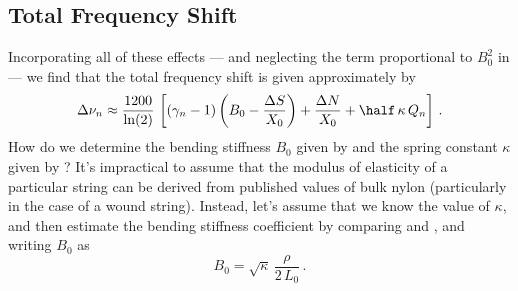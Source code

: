 \subsection{Total Frequency Shift}

Incorporating all of these effects --- and neglecting the term proportional to $B_0^2$ in  --- we find that the total frequency shift is given approximately by
\begin{equation}\label{eqn:error_tot}
  \Delta \nu_n \approx \frac{1200}{\ln(2)}\, \left[ \left(\gamma_n - 1\right) \left(B_0 - \frac{\Delta S}{X_0}\right) + \frac{\Delta N}{X_0} + \half\, \kappa\, Q_n \right]\, .
\end{equation}
How do we determine the bending stiffness $B_0$ given by  and the spring constant $\kappa$ given by ? It's impractical to assume that the modulus of elasticity of a particular string can be derived from published values of bulk nylon (particularly in the case of a wound string). Instead, let's assume that we know the value of $\kappa$, and then estimate the bending stiffness coefficient by comparing  and , and writing $B_0$ as
\begin{equation} \label{eqn:b_0_kappa}
  B_0 = \sqrt{\kappa}\, \frac{\rho}{2\, L_0}\, .
\end{equation}


